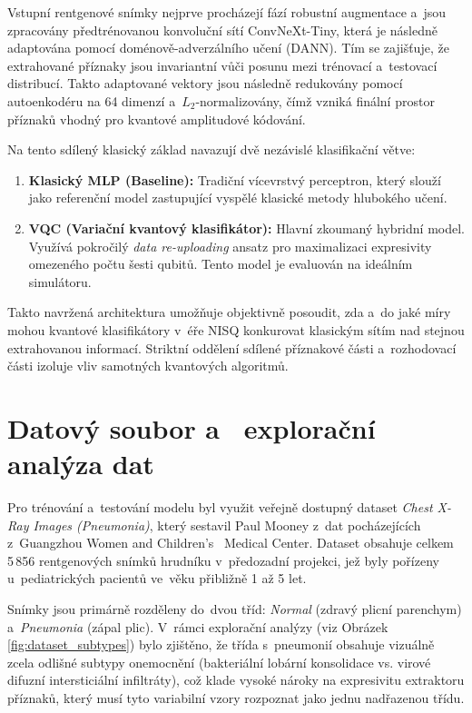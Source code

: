 \documentclass[12pt, a4paper]{report}
\begin{document}
Vstupní rentgenové snímky nejprve procházejí fází robustní augmentace a~jsou zpracovány předtrénovanou konvoluční sítí ConvNeXt-Tiny, která je následně adaptována pomocí doménově-adverzálního učení (DANN). Tím se zajišťuje, že extrahované příznaky jsou invariantní vůči posunu mezi trénovací a~testovací distribucí. Takto adaptované vektory jsou následně redukovány pomocí autoenkodéru na 64 dimenzí a~$L_2$-normalizovány, čímž vzniká finální prostor příznaků vhodný pro kvantové amplitudové kódování.

Na tento sdílený klasický základ navazují dvě nezávislé klasifikační větve:
\begin{enumerate}
    \item \textbf{Klasický MLP (Baseline):} Tradiční vícevrstvý perceptron, který slouží jako referenční model zastupující vyspělé klasické metody hlubokého učení.
    \item \textbf{VQC (Variační kvantový klasifikátor):} Hlavní zkoumaný hybridní model. Využívá pokročilý \textit{data re-uploading} ansatz pro maximalizaci expresivity omezeného počtu šesti qubitů. Tento model je evaluován na ideálním simulátoru.
\end{enumerate}

Takto navržená architektura umožňuje objektivně posoudit, zda a~do jaké míry mohou kvantové klasifikátory v~éře NISQ konkurovat klasickým sítím nad stejnou extrahovanou informací. Striktní oddělení sdílené příznakové části a~rozhodovací části izoluje vliv samotných kvantových algoritmů.

\section{Datový soubor a ~explorační analýza dat} \label{sec:dataset}

Pro trénování a~testování modelu byl využit veřejně dostupný dataset \textit{Chest X-Ray Images (Pneumonia)}, který sestavil Paul Mooney z~dat pocházejících z~Guangzhou Women and Children’s ~Medical Center. Dataset obsahuje celkem 5\,856 rentgenových snímků hrudníku v~předozadní projekci, jež byly pořízeny u~pediatrických pacientů ve~věku přibližně 1 až 5 let.

Snímky jsou primárně rozděleny do~dvou tříd: \textit{Normal} (zdravý plicní parenchym) a~\textit{Pneumonia} (zápal plic). V~rámci explorační analýzy (viz Obrázek \ref{fig:dataset_subtypes}) bylo zjištěno, že třída s~pneumonií obsahuje vizuálně zcela odlišné subtypy onemocnění (bakteriální lobární konsolidace vs. virové difuzní intersticiální infiltráty), což klade vysoké nároky na expresivitu extraktoru příznaků, který musí tyto variabilní vzory rozpoznat jako jednu nadřazenou třídu.
\end{document}
